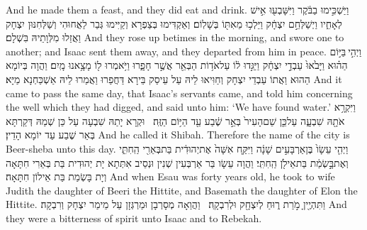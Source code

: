 {And he made them a feast, and they did eat and drink.}{}
{וַיַּשְׁכִּ֣ימוּ בַבֹּ֔קֶר וַיִּשָּׁבְע֖וּ אִ֣ישׁ לְאָחִ֑יו וַיְשַׁלְּחֵ֣ם יִצְחָ֔ק וַיֵּלְכ֥וּ מֵאִתּ֖וֹ בְּשָׁלֽוֹם׃}
{וְאַקְדִּימוּ בְּצַפְרָא וְקַיִּימוּ גְּבַר לַאֲחוּהִי וְשַׁלְּחִנּוּן יִצְחָק וַאֲזַלוּ מִלְּוָתֵיהּ בִּשְׁלָם׃}
{And they rose up betimes in the morning, and swore one to another; and Isaac sent them away, and they departed from him in peace.}{}
{וַיְהִ֣י \legarmeh  בַּיּ֣וֹם הַה֗וּא וַיָּבֹ֙אוּ֙ עַבְדֵ֣י יִצְחָ֔ק וַיַּגִּ֣דוּ ל֔וֹ עַל\maqqaf אֹד֥וֹת הַבְּאֵ֖ר אֲשֶׁ֣ר חָפָ֑רוּ וַיֹּ֥אמְרוּ ל֖וֹ מָצָ֥אנוּ מָֽיִם׃}
{וַהֲוָה בְּיוֹמָא הַהוּא וַאֲתוֹ עַבְדֵי יִצְחָק וְחַוִּיאוּ לֵיהּ עַל עֵיסַק בֵּירָא דַּחֲפַרוּ וַאֲמַרוּ לֵיהּ אַשְׁכַּחְנָא מַיָּא׃}
{And it came to pass the same day, that Isaac’s servants came, and told him concerning the well which they had digged, and said unto him: ‘We have found water.’}{}
{וַיִּקְרָ֥א אֹתָ֖הּ שִׁבְעָ֑ה עַל\maqqaf כֵּ֤ן שֵׁם\maqqaf הָעִיר֙ בְּאֵ֣ר שֶׁ֔בַע עַ֖ד הַיּ֥וֹם הַזֶּֽה׃ \setuma }
{וּקְרָא יָתַהּ שִׁבְעָה עַל כֵּן שְׁמַהּ דְּקַרְתָּא בְּאֵר שֶׁבַע עַד יוֹמָא הָדֵין׃}
{And he called it Shibah. Therefore the name of the city is Beer-sheba unto this day.}{}
{וַיְהִ֤י עֵשָׂו֙ בֶּן\maqqaf אַרְבָּעִ֣ים שָׁנָ֔ה וַיִּקַּ֤ח אִשָּׁה֙ אֶת\maqqaf יְהוּדִ֔ית בַּת\maqqaf בְּאֵרִ֖י הַֽחִתִּ֑י וְאֶת\maqqaf בָּ֣שְׂמַ֔ת בַּת\maqqaf אֵילֹ֖ן הַֽחִתִּֽי׃}
{וַהֲוָה עֵשָׂו בַּר אַרְבְּעִין שְׁנִין וּנְסֵיב אִתְּתָא יָת יְהוּדִית בַּת בְּאֵרִי חִתָּאָה וְיָת בָּשְׂמַת בַּת אֵילוֹן חִתָּאָה׃}
{And when Esau was forty years old, he took to wife Judith the daughter of Beeri the Hittite, and Basemath the daughter of Elon the Hittite.}{}
{וַתִּהְיֶ֖יןָ מֹ֣רַת ר֑וּחַ לְיִצְחָ֖ק וּלְרִבְקָֽה׃ \setuma }
{וַהֲוַאָה מְסָרְבָן וּמַרְגְּזָן עַל מֵימַר יִצְחָק וְרִבְקָה׃}
{And they were a bitterness of spirit unto Isaac and to Rebekah.}{}
